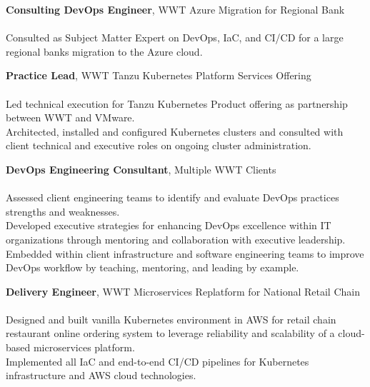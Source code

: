 \documentclass[letterpaper]{article}
\begin{document}
{\textbf{Consulting DevOps Engineer}, WWT Azure Migration for Regional Bank } \\
\hspace{5mm}{\sl (Microsoft Azure, Azure DevOps, Terraform, Ansible)} \\
Consulted as Subject Matter Expert on DevOps, IaC, and CI/CD for a large regional
  bank\textquotesingle{}s migration to the Azure cloud.\\
\vspace*{2mm}

{\textbf{Practice Lead}, WWT Tanzu Kubernetes Platform Services Offering} \\
\hspace{5mm}{\sl (VMware Tanzu Kubernetes Grid (TKG), Kubernetes, Terraform, Ansible, Helm,
  VMware ESX, Amazon AWS)} \\
Led technical execution for Tanzu Kubernetes Product offering as partnership
  between WWT and VMware. \\
Architected, installed and configured Kubernetes clusters and consulted with
  client technical and executive roles on ongoing cluster administration.\\
\vspace*{2mm}

{\textbf{DevOps Engineering Consultant}, Multiple WWT Clients} \\
\hspace{5mm}{\sl (The Three Ways, Theory of Constraints, The Five Pillars, SRE, Kaizen, Lean, Kanban, Scrum)} \\
Assessed client engineering teams to identify and evaluate DevOps practices
  strengths and weaknesses.\\
Developed executive strategies for enhancing DevOps excellence within IT
  organizations through mentoring and collaboration with executive leadership.
Embedded within client infrastructure and software engineering teams to improve
  DevOps workflow by teaching, mentoring, and leading by example.\\
\vspace*{2mm}

{\textbf{Delivery Engineer}, WWT Microservices Replatform for National Retail Chain} \\
\hspace{5mm}{\sl (Kubernetes, KOPS, Helm, Amazon AWS, Ansible, Terraform, GitLab CI, Packer, Docker, Jenkins, PostgreSQL)} \\
Designed and built vanilla Kubernetes environment in AWS for retail chain
  restaurant online ordering system to leverage reliability and scalability of
  a cloud-based microservices platform.\\
Implemented all IaC and end-to-end CI/CD pipelines for Kubernetes
  infrastructure and AWS cloud technologies.\\
\vspace*{2mm}
\end{document}

